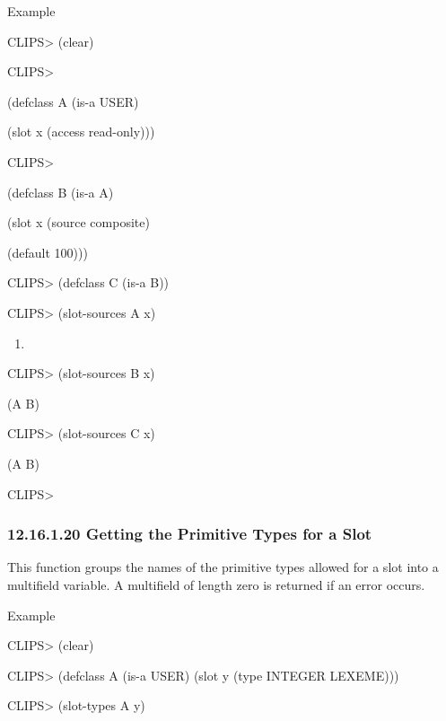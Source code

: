 \documentclass[letterpaper,10pt,english]{sphinxmanual}
\begin{document}
Example

CLIPS\textgreater{} (clear)

CLIPS\textgreater{}

(defclass A (is-a USER)

(slot x (access read-only)))

CLIPS\textgreater{}

(defclass B (is-a A)

(slot x (source composite)

(default 100)))

CLIPS\textgreater{} (defclass C (is-a B))

CLIPS\textgreater{} (slot-sources A x)
\begin{enumerate}
\def\theenumi{\Alph{enumi}}
\def\labelenumi{(\theenumi )}
\makeatletter\def\p@enumii{\p@enumi (\theenumi )}\makeatother
\item {} 
\end{enumerate}

CLIPS\textgreater{} (slot-sources B x)

(A B)

CLIPS\textgreater{} (slot-sources C x)

(A B)

CLIPS\textgreater{}


\subsubsection{12.16.1.20 Getting the Primitive Types for a Slot}
\label{\detokenize{actions:getting-the-primitive-types-for-a-slot}}
This function groups the names of the primitive types allowed for a slot
into a multifield variable. A multifield of length zero is returned if
an error occurs.


\begin{sphinxVerbatim}[commandchars=\\\{\}]
  
\end{sphinxVerbatim}

Example

CLIPS\textgreater{} (clear)

CLIPS\textgreater{} (defclass A (is-a USER) (slot y (type INTEGER LEXEME)))

CLIPS\textgreater{} (slot-types A y)
\end{document}
